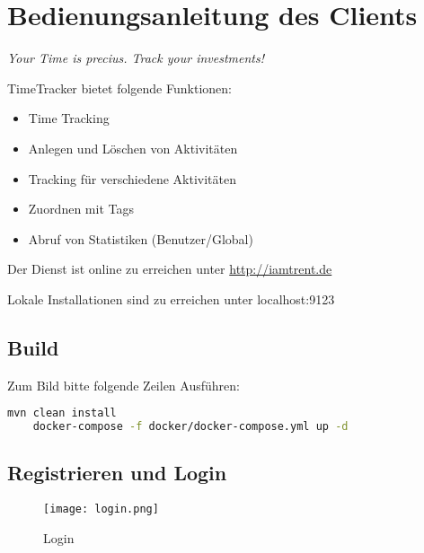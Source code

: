 
\section{Bedienungsanleitung des Clients}

\begin{center}
	\textit{Your Time is precius. \newline Track your investments!}
\end{center}


TimeTracker bietet folgende Funktionen:
\begin{itemize}
	\item Time Tracking
	\item Anlegen und Löschen von Aktivitäten %
	\item Tracking für verschiedene Aktivitäten
	\item Zuordnen mit Tags
	\item Abruf von Statistiken (Benutzer/Global)
\end{itemize}


Der Dienst ist online zu erreichen unter \url{http://iamtrent.de}

Lokale Installationen sind zu erreichen unter localhost:9123

\subsection{Build}

Zum Bild bitte folgende Zeilen Ausführen:
\begin{lstlisting}[language=bash]
	mvn clean install
	docker-compose -f docker/docker-compose.yml up -d
\end{lstlisting}

\subsection{Registrieren und Login }
 
 \begin{figure}[H]
 	\hspace{-1.5cm}
 	\texttt{[image: login.png]}
 	\caption{Login}
 	\label{fig:login}
 \end{figure}

